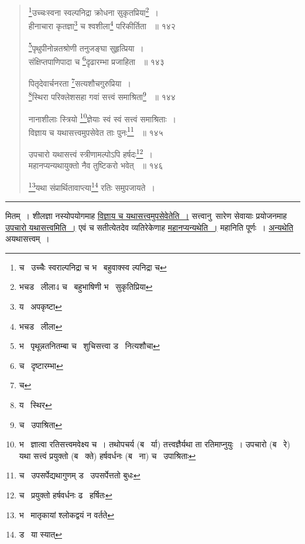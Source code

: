 \documentclass[11pt, openany]{book}
\begin{document}
{\begin{quote}
{\renewcommand{\thefootnote}{3}\footnote{च \textendash\ उच्चैः स्वराल्पनिद्रा च भ \textendash\ बहुवाक्स्व ल्पनिद्रा च}उच्चःस्वना स्वल्पनिद्रा क्रोधना सुकृतप्रिया\renewcommand{\thefootnote}{4}\footnote{भचड \textendash\ लीला4 च \textendash\ बहुभाषिणी भ \textendash\ सुकृतिप्रिया}~। \\
हीनाचारा कृतज्ञा\renewcommand{\thefootnote}{5}\footnote{य \textendash\ अपकृष्टा} च श्वशीला\renewcommand{\thefootnote}{6}\footnote{भचड \textendash\ लीला} परिकीर्तिता ~॥ १४२ 

\renewcommand{\thefootnote}{7}\footnote{भ \textendash\ पृथून्नतनितम्बा च
 \textendash\ शुचिसत्त्वा ड \textendash\ नित्यशौचा}पृथुपीनोन्नतश्रोणी तनुजङ्घा सुहृत्प्रिया~।\\ 
संक्षिप्तपाणिपादा च \renewcommand{\thefootnote}{8}\footnote{च \textendash\ दृष्टारम्भा}दृढारम्भा प्रजाहिता ~॥ १४३ 

पितृदेवार्चनरता \renewcommand{\thefootnote}{9}\footnote{च}सत्यशौचगुरुप्रिया~।\\ 
\renewcommand{\thefootnote}{10}\footnote{य \textendash\ स्थिर }स्थिरा परिक्लेशसहा गवां सत्त्वं समाश्रिता\renewcommand{\thefootnote}{11}\footnote{च \textendash\ उपाश्रिता} ~॥ १४४

नानाशीलाः स्त्रियो \renewcommand{\thefootnote}{12}\footnote{भ \textendash\ ज्ञात्वा रतिसत्त्वमवेक्ष्य च~। तथोपचर्य (ब \textendash\ र्या) तत्त्वज्ञैर्यथा ता रतिमाप्नुयुः~। उपचारो (ब \textendash\ रे) यथा सत्त्वं प्रयुक्तो (ब \textendash\ क्ते) हर्षवर्धनः (ब \textendash\ ना) च \textendash\ उपाश्रिताः }ज्ञेयाः स्वं स्वं सत्त्वं समाश्रिताः~। \\
विज्ञाय च यथासत्त्वमुपसेवेत ताः पुनः\renewcommand{\thefootnote}{13}\footnote{च \textendash\ उपसर्पेद्यथागुणम् ड \textendash\ उपसर्पेत्ततो बुधः} ~॥ १४५ 

उपचारो यथासत्त्वं स्त्रीणामल्पोऽपि हर्षदः\renewcommand{\thefootnote}{14}\footnote{च \textendash\ प्रयुक्तो हर्षवर्धनः ढ \textendash\ हर्षितः}~।\\ 
महानप्यन्यथायुक्तो नैव तुष्टिकरो भवेत् ~॥ १४६ 

\renewcommand{\thefootnote}{15}\footnote{भ \textendash\ मातृकायां श्लोकद्वयं न वर्तते }यथा संप्रार्थितावाप्त्या\renewcommand{\thefootnote}{16}\footnote{ड \textendash\ या स्यात् } रतिः समुपजायते~। }
\end{quote}

\hrule

\vspace{2mm}

\noindent
मितम्~। शीलज्ञा नस्योपयोगमाह \underline{विज्ञाय च यथासत्त्वमुपसेवेतेति~।} सत्त्वानु\textendash\ सारेण सेवायाः प्रयोजनमाह \underline{उपचारो यथासत्त्वमिति~।} एवं च सतीत्येतदेव व्यतिरेकेणाह \underline{महानप्यन्यथेति~।} महानिति पूर्णः~। \underline{अन्यथेति} अयथासत्त्वम्~। 

}
\end{document}
